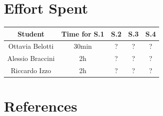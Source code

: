 \documentclass[table, 12pt]{article}
\begin{document}
\section{Effort Spent}
    \begin{tabular}{| c || c | c| c| c |}
        \hline
        Student & Time for S.1 & S.2 & S.3 & S.4 \\ \hline
        Ottavia Belotti & 30min & ? & ? & ? \\
        Alessio Braccini & 2h & ? & ? & ? \\
        Riccardo Izzo & 2h & ? & ? & ? \\
        \hline
    \end{tabular}

\section{References}
\end{document}
